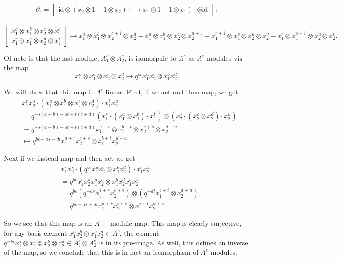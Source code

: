 \documentclass[12pt,a4paper]{article}
\newcommand\1{_{(1)}}
\newcommand\2{_{(2)}}
\begin{document}
\newpage
\[\partial_1=\begin{bmatrix}\text{id}\otimes(x_2\otimes 1-1\otimes x_2)\cdot&(x_1\otimes 1-1\otimes x_1)\cdot\otimes\text{id}\end{bmatrix}:\]\\
\[\begin{bmatrix}x_1^a\otimes x_1^b\otimes x_2^c\otimes x_2^d\\x_1^r\otimes x_1^s\otimes x_2^u\otimes x_2^v\end{bmatrix}\mapsto x_1^a\otimes x_1^b\otimes x_2^{c+1}\otimes x_2^d-x_1^a\otimes x_1^b\otimes x_2^c\otimes x_2^{d+1}
+ x_1^{r+1}\otimes x_1^s\otimes x_2^u\otimes x_2^v-x_1^r\otimes x_1^{s+1}\otimes x_2^u\otimes x_2^v.
\]

Of note is that the last module, $A_1^e\otimes A_2^e$, is isomorphic to $A^e$ as $A^e$-modules via the map
\[
x_1^a\otimes x_1^b\otimes x_2^c\otimes x_2^d\mapsto q^{bc} x_1^ax_2^c\otimes x_1^bx_2^d.  
\]

We will show that this map is $A^e$-linear. 
First, if we act and then map, we get
\begin{align*}
&x_1^rx_2^s\cdot(x_1^a\otimes x_1^b\otimes x_2^c\otimes c_2^d)\cdot x_1^tx_2^u\\
&=q^{-s(a+b)-st-t(c+d)}(x_1^r\cdot(x_1^a\otimes x_1^b)\cdot x_1^t)\otimes(x_2^s\cdot(x_2^c\otimes x_2^d)\cdot x_2^u)\\
&=q^{-s(a+b)-st-t(c+d)}x_1^{a+r}\otimes x_1^{b+t}\otimes x_2^{c+s}\otimes x_2^{d+u}\\
&\mapsto q^{bc-as-dt}x_1^{a+r}x_2^{c+s}\otimes x_1^{b+t}x_2^{d+u}.
\end{align*}

Next if we instead map and then act we get
\begin{align*}
&x_1^rx_2^s\cdot(q^{bc}x_1^ax_2^c\otimes x_1^bx_2^d)\cdot x_1^tx_2^u\\
&=q^{bc}x_1^rx_2^sx_1^ax_2^c\otimes x_1^bx_2^dx_1^tx_2^u\\
&=q^{bc}\left(q^{-as}x_1^{a+r}x_2^{c+s}\right)\otimes\left(q^{-dt}x_1^{b+t}\otimes x_2^{d+u}\right)\\
&=q^{bc-as-dt}x_1^{a+r}x_2^{c+s}\otimes x_1^{b+t}x_2^{d+u}
\end{align*}

So we see that this map is an $A^e-$module map.
This map is clearly surjective, for any basis element $x_1^ax_2^b\otimes x_1^cx_2^d\in A^e$, the element $q^{-bc}x_1^a\otimes x_1^c\otimes x_2^b\otimes x_2^d\in A_1^e\otimes A_2^e$ is in its pre-image.
As well, this defines an inverse of the map, so we conclude that this is in fact an isomorphism of $A^e$-modules.
\end{document}
